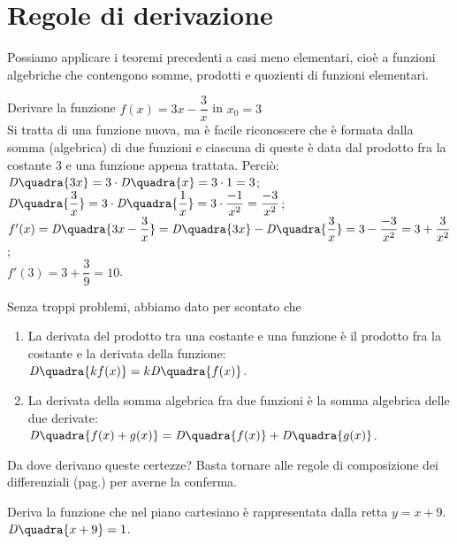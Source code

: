 \section{Regole di derivazione}
\label{sec:diff01_regolederivate}
Possiamo applicare i teoremi precedenti a casi meno elementari, cioè
a funzioni algebriche che contengono somme, prodotti e quozienti di
funzioni elementari. 
\begin{esempio}
  Derivare la funzione $f(x)= 3x-\dfrac{3}{x}$ in $x_0=3$\\
  Si tratta di una funzione nuova, ma è facile riconoscere che è formata 
  dalla somma (algebrica) di due funzioni e ciascuna di queste è data dal 
  prodotto fra la costante $3$ e una funzione appena trattata. Perciò:\\
  $\mathit{D}\quadra{3x}=3\cdot\mathit{D}\quadra{x}=3\cdot 1=3$; \tab
  $\mathit{D}\quadra{\dfrac{3}{x}}=3\cdot\mathit{D}\quadra{\dfrac{1}{x}}
  =3\cdot \dfrac{-1}{x^2}=\dfrac{-3}{x^2}$;\\
  $f'(x)=\mathit{D}\quadra{3x-\dfrac{3}{x}}=\mathit{D}\quadra{3x}-
  \mathit{D}\quadra{\dfrac{3}{x}}= 3-\dfrac{-3}{x^2}= 3+\dfrac{3}{x^2}$;\\
  $f'(3)=3+\dfrac{3}{9}= 10$.\\
\end{esempio}
Senza troppi problemi, abbiamo dato per scontato che 
\begin{enumerate}[noitemsep]
 \item La derivata del prodotto tra una costante e  una funzione è il prodotto
 fra la costante e la derivata della funzione:\\ 
 $\mathit{D}\quadra{kf(x)}=k\mathit{D}\quadra{f(x)}$.
 \item La derivata della somma algebrica fra due funzioni è la somma algebrica
 delle due derivate:\\
$\mathit{D}\quadra{f(x)+g(x)}=\mathit{D}\quadra{f(x)}+\mathit{D}\quadra{g(x)}$.
\end{enumerate}
Da dove derivano queste certezze? Basta tornare alle regole di composizione
dei differenziali (pag.\pageref{subsec:diff01_combdiff}) per averne la conferma.

\begin{esempio}
Deriva la funzione che nel piano cartesiano è rappresentata dalla retta $y=x+9$.\\
$\mathit{D}\quadra{x+9}=1$.
\end{esempio}


